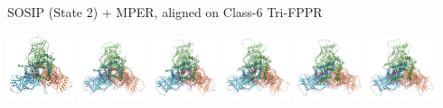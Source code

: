 \begin{frame}[fragile]{SOSIP (State 2) + MPER, aligned on Class-6 Tri-FPPR}
\begin{center}
    \includegraphics[width=0.149\textwidth]{ppt/media/image1.png}
    \includegraphics[width=0.149\textwidth]{ppt/media/image2.png}
    \includegraphics[width=0.149\textwidth]{ppt/media/image3.png}
    \includegraphics[width=0.149\textwidth]{ppt/media/image4.png}
    \includegraphics[width=0.149\textwidth]{ppt/media/image10.png}
    \includegraphics[width=0.149\textwidth]{ppt/media/image12.png}
    \end{center}
\end{frame}

